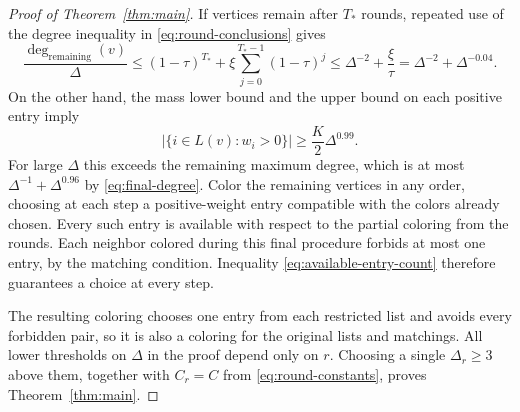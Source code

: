 \begin{proof}[Proof of Theorem~\ref{thm:main}]
If vertices remain after $T_*$ rounds, repeated use of the degree
inequality in \eqref{eq:round-conclusions} gives
\begin{equation}\label{eq:final-degree}
 \frac{\deg_{\mathrm{remaining}}(v)}{\Delta}
 \le(1-\tau)^{T_*}+\xi\sum_{j=0}^{T_*-1}(1-\tau)^j
 \le\Delta^{-2}+\frac{\xi}{\tau}
 =\Delta^{-2}+\Delta^{-0.04}.
\end{equation}
On the other hand, the mass lower bound and the upper bound on each
positive entry imply
\begin{equation}\label{eq:available-entry-count}
 \bigl|\{i\in L(v):w_i>0\}\bigr|
 \ge\frac K2\Delta^{0.99}.
\end{equation}
For large $\Delta$ this exceeds the remaining maximum degree, which
is at most $\Delta^{-1}+\Delta^{0.96}$ by \eqref{eq:final-degree}.
Color the remaining vertices in any order, choosing at each step a
positive-weight entry compatible with the colors already chosen.
Every such entry is available with respect to the partial coloring
from the rounds.  Each neighbor colored during this final procedure
forbids at most one entry, by the matching condition.  Inequality
\eqref{eq:available-entry-count} therefore guarantees a choice at
every step.

The resulting coloring chooses one entry from each restricted list
and avoids every forbidden pair, so it is also a coloring for the
original lists and matchings.  All lower thresholds on $\Delta$ in
the proof depend only on $r$.  Choosing a single
$\Delta_r\ge3$ above them, together with $C_r=C$ from
\eqref{eq:round-constants}, proves Theorem~\ref{thm:main}.
\end{proof}
